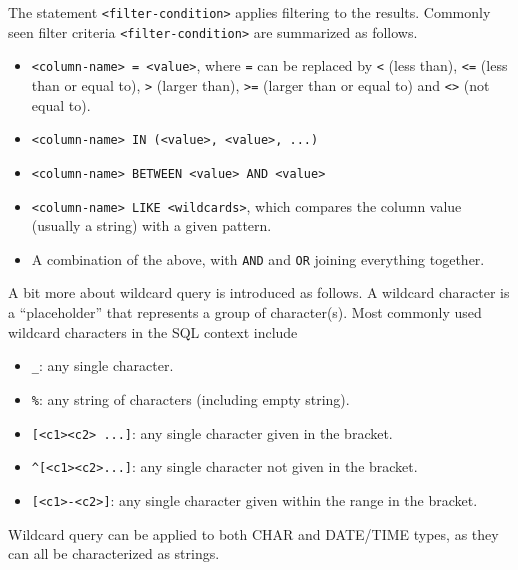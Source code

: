 The statement \verb|<filter-condition>| applies filtering to the results. Commonly seen filter criteria \verb|<filter-condition>| are summarized as follows.
\begin{itemize}
  \item \verb|<column-name> = <value>|, where \verb|=| can be replaced by \verb|<| (less than), \verb|<=| (less than or equal to), \verb|>| (larger than), \verb|>=| (larger than or equal to) and \verb|<>| (not equal to).
  \item \verb|<column-name> IN (<value>, <value>, ...)|
  \item \verb|<column-name> BETWEEN <value> AND <value>|
  \item \verb|<column-name> LIKE <wildcards>|, which compares the column value (usually a string) with a given pattern.
  \item A combination of the above, with \verb|AND| and \verb|OR| joining everything together.
\end{itemize}

A bit more about wildcard query is introduced as follows. A wildcard character is a ``placeholder'' that represents a group of character(s). Most commonly used wildcard characters in the SQL context include
\begin{itemize}
  \item \verb|_|: any single character.
  \item \verb|%|: any string of characters (including empty string).
  \item \verb|[<c1><c2> ...]|: any single character given in the bracket.
  \item \verb|^[<c1><c2>...]|: any single character not given in the bracket.
  \item \verb|[<c1>-<c2>]|: any single character given within the range in the bracket.
\end{itemize}
Wildcard query can be applied to both CHAR and DATE/TIME types, as they can all be characterized as strings.


